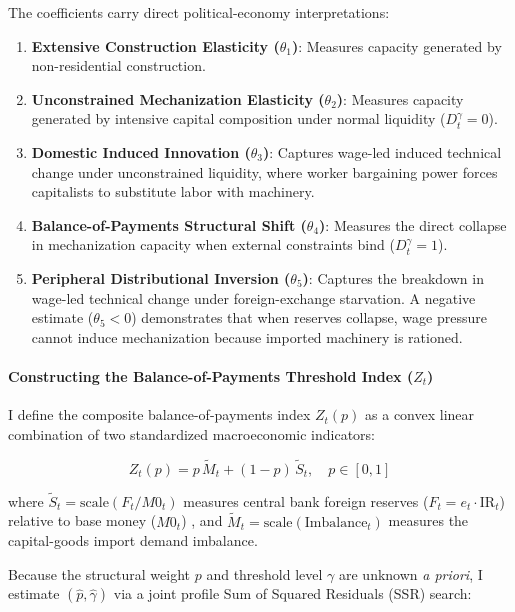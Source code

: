 The coefficients carry direct political-economy interpretations:
\begin{enumerate}
	\item \textbf{Extensive Construction Elasticity ($\theta_1$)}: Measures capacity generated by non-residential construction.
	\item \textbf{Unconstrained Mechanization Elasticity ($\theta_2$)}: Measures capacity generated by intensive capital composition under normal liquidity ($D_t^{\gamma} = 0$).
	\item \textbf{Domestic Induced Innovation ($\theta_3$)}: Captures wage-led induced technical change under unconstrained liquidity, where worker bargaining power forces capitalists to substitute labor with machinery.
	\item \textbf{Balance-of-Payments Structural Shift ($\theta_4$)}: Measures the direct collapse in mechanization capacity when external constraints bind ($D_t^{\gamma} = 1$).
	\item \textbf{Peripheral Distributional Inversion ($\theta_5$)}: Captures the breakdown in wage-led technical change under foreign-exchange starvation. A negative estimate ($\theta_5 < 0$) demonstrates that when reserves collapse, wage pressure cannot induce mechanization because imported machinery is rationed.
\end{enumerate}

\paragraph{Constructing the Balance-of-Payments Threshold Index ($Z_t$)}
I define the composite balance-of-payments index $Z_t(p)$ as a convex linear combination of two standardized macroeconomic indicators:

\begin{equation}
	Z_t(p) = p \, \tilde{M}_t + (1 - p) \, \tilde{S}_t, \quad p \in [0, 1]
\end{equation}

where $\tilde{S}_t = \text{scale}(F_t / M0_t)$ measures central bank foreign reserves ($F_t = e_t \cdot \text{IR}_t$) relative to base money ($M0_t$) \citep{NievasPiketty2025}, and $\tilde{M}_t = \text{scale}(\text{Imbalance}_t)$ measures the capital-goods import demand imbalance. 

Because the structural weight $p$ and threshold level $\gamma$ are unknown \textit{a priori}, I estimate $(\hat{p}, \hat{\gamma})$ via a joint profile Sum of Squared Residuals (SSR) search:

